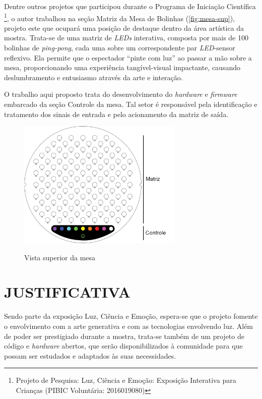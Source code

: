   Dentre outros projetos que participou durante o Programa de Iniciação Científica \footnote{Projeto de Pesquisa: Luz, Ciência e Emoção: Exposição Interativa para Crianças (PIBIC Voluntária: 2016019080)}, o autor trabalhou na seção Matriz da Mesa de Bolinhas (\autoref{fig:mesa-sup}), projeto este que ocupará uma posição de destaque dentro da área artística da mostra. Trata-se de uma matriz de \emph{LEDs} interativa, composta por mais de 100 bolinhas de \emph{ping-pong}, cada uma sobre um correspondente par \emph{LED}-sensor reflexivo. Ela permite que o espectador ``pinte com luz'' ao passar a mão sobre a mesa, proporcionando uma experiência tangível-visual impactante, causando deslumbramento e entusiasmo através da arte e interação.
  
  O trabalho aqui proposto trata do desenvolvimento do \emph{hardware} e \emph{firmware} embarcado da seção Controle da mesa. Tal setor é responsável pela identificação e tratamento dos sinais de entrada e pelo acionamento da matriz de saída.

\begin{figure}[H]%
    \centering
    \caption{Vista superior da mesa}
    \includegraphics[width=0.7\textwidth]{./dados/figuras/mesa-cad}
    \label{fig:mesa-sup}
\end{figure}

\section{JUSTIFICATIVA}
\label{sec:justificativa}

  Sendo parte da exposição Luz, Ciência e Emoção, espera-se que o projeto fomente o envolvimento com a arte generativa e com as tecnologias envolvendo luz. Além de poder ser prestigiado durante a mostra, trata-se também de um projeto de código e \emph{hardware} abertos, que serão disponibilizados à comunidade para que possam ser estudados e adaptados às suas necessidades.

